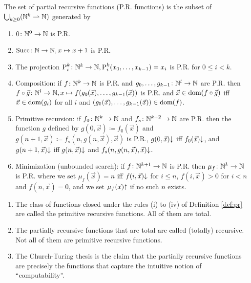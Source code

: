 \begin{boxdefi}\label{def:pr}
    The set of \alert{partial recursive functions (P.R. functions)} is the subset of $\bigcup_{k \ge 0}(\mathbb{N}^k \rightharpoonup \mathbb{N})$ generated by
    \begin{enumerate}
        \item $0 \colon \mathbb{N}^0 \to \mathbb{N}$ is P.R.
        \item $\text{Succ} \colon \mathbb{N} \to \mathbb{N}, x \mapsto x + 1$ is P.R.
        \item The projection $\text{P}_{i}^{k} \colon \mathbb{N}^k \to \mathbb{N},  \text{P}_{i}^{k}(x_0, \dots, x_{k-1}) = x_i$ is P.R. for $0 \le i < k$.
        \item Composition: if $f \colon \mathbb{N}^k \to \mathbb{N}$ is P.R. and $g_0, \dots, g_{k-1} \colon \mathbb{N}^l \to \mathbb{N}$ are P.R. then $f \circ \vec{g} \colon \mathbb{N}^l \to \mathbb{N}, x \mapsto f(g_0(\vec{x}), \dots, g_{k-1}(\vec{x}))$ is P.R. and $\vec{x} \in \text{dom}(f \circ \vec{g})$ iff $\vec{x} \in \text{dom}(g_i)$ for all $i$ and $(g_0(\vec{x}), \dots, g_{k-1}(\vec{x})) \in \text{dom}(f)$.
    \item Primitive recursion: if $f_0 \colon \mathbb{N}^k \to \mathbb{N}$ and $f_s \colon \mathbb{N}^{k+2} \to \mathbb{N}$ are P.R. then the function $g$ defined by $g(0, \vec{x}) \coloneq f_0(\vec{x})$ and $g(n+1, \vec{x}) \coloneq f_s(n, g(n, \vec{x}), \vec{x})$ is P.R., $g(0, \vec{x}){\downarrow}$ iff $f_0(\vec{x}){\downarrow}$, and $g(n + 1, \vec{x}){\downarrow}$ iff $g(n, \vec{x}){\downarrow}$ and $f_s(n, g(n, \vec{x}), \vec{x}){\downarrow}$.
    \item Minimization (unbounded search): if $f \colon \mathbb{N}^{k + 1} \to \mathbb{N}$ is P.R. then $\mu_f \colon \mathbb{N}^k \to \mathbb{N}$ is P.R. where we set $\mu_f(\vec{x}) = n$ iff $f(i, \vec{x}){\downarrow}$ for $i \le n$, $f(i, \vec{x}) > 0$ for $i < n$ and $f(n, \vec{x}) = 0$, and we set $\mu_f(\vec{x}){\uparrow}$ if no such $n$ exists.
    \end{enumerate}
\end{boxdefi}

\begin{rem}
    \hfill
    \begin{enumerate}
        \item The class of functions closed under the rules (i) to (iv) of Definition \ref{def:pr} are called the \alert{primitive recursive functions}. All  of them are total.
        \item The partially recursive functions that are total are called \alert{(totally) recursive}. Not all of them are primitive recursive functions.
        \item The Church-Turing thesis is the claim that the partially recursive functions are precisely the functions that capture the intuitive notion of ``computability''.
    \end{enumerate}
\end{rem}

